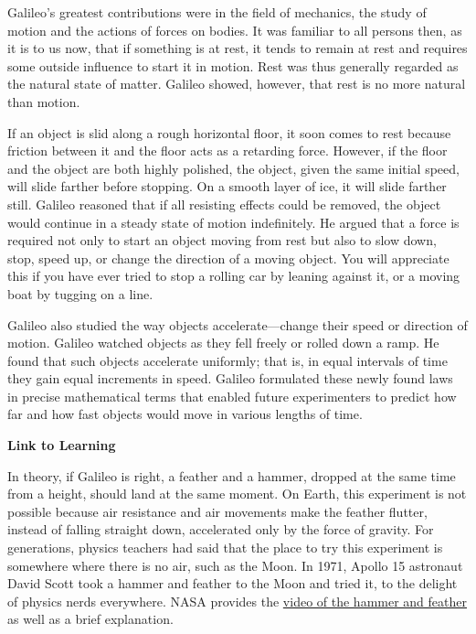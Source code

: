 \documentclass[../../main-astronomy.tex]{subfiles}
\begin{document}
Galileo's greatest contributions were in the field of mechanics, the study of motion and the actions of forces on bodies. It was familiar to all persons then, as it is to us now, that if something is at rest, it tends to remain at rest and requires some outside influence to start it in motion. Rest was thus generally regarded as the natural state of matter. Galileo showed, however, that rest is no more natural than motion.

\vspace{1em}

If an object is slid along a rough horizontal floor, it soon comes to rest because friction between it and the floor acts as a retarding force. However, if the floor and the object are both highly polished, the object, given the same initial speed, will slide farther before stopping. On a smooth layer of ice, it will slide farther still. Galileo reasoned that if all resisting effects could be removed, the object would continue in a steady state of motion indefinitely. He argued that a force is required not only to start an object moving from rest but also to slow down, stop, speed up, or change the direction of a moving object. You will appreciate this if you have ever tried to stop a rolling car by leaning against it, or a moving boat by tugging on a line.

\vspace{1em}

Galileo also studied the way objects accelerate---change their speed or direction of motion. Galileo watched objects as they fell freely or rolled down a ramp. He found that such objects accelerate uniformly; that is, in equal intervals of time they gain equal increments in speed. Galileo formulated these newly found laws in precise mathematical terms that enabled future experimenters to predict how far and how fast objects would move in various lengths of time.

\begin{mdframed}[backgroundcolor=black!10]
    \textbf{Link to Learning}

    \vspace{1ex}

    In theory, if Galileo is right, a feather and a hammer, dropped at the same time from a height, should land at the same moment. On Earth, this experiment is not possible because air resistance and air movements make the feather flutter, instead of falling straight down, accelerated only by the force of gravity. For generations, physics teachers had said that the place to try this experiment is somewhere where there is no air, such as the Moon. In 1971, Apollo 15 astronaut David Scott took a hammer and feather to the Moon and tried it, to the delight of physics nerds everywhere. NASA provides the \href{https://openstax.org/l/30HamVsFeath}{video of the hammer and feather} as well as a brief explanation.
\end{mdframed}
\end{document}

